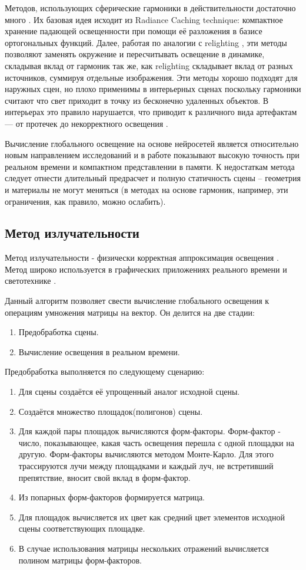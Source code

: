 \documentclass[oneside,final,12pt, a4paper]{extreport}
\newcommand\subsect[1]{%
  \subsection*{#1}%
  \addcontentsline{toc}{subsection}{#1}}
\begin{document}
Методов, использующих сферические гармоники в действительности достаточно много \cite{SPH, RadianceHints, PRT, ClusteredPRT, PRT2}. Их базовая идея исходит из Radiance Caching technique: компактное хранение падающей освещенности при помощи её разложения в базисе ортогональных функций. Далее, работая по аналогии с relighting \cite{RadianceHints, Relighting}, эти методы позволяют заменять окружение и пересчитывать освещение в динамике, складывая вклад от гармоник так же, как relighting складывает вклад от разных источников, суммируя отдельные изображения. Эти методы хорошо подходят для наружных сцен, но плохо применимы в интерьерных сценах поскольку гармоники считают что свет приходит в точку из бесконечно удаленных объектов. В интерьерах это правило нарушается, что приводит к различного вида артефактам --- от протечек до некорректного освещения \cite{RT_rendering}.

Вычисление глобального освещение на основе нейросетей является относительно новым направлением исследований и в работе \cite{NNGI} показывают высокую точность при реальном времени и компактном представлении в памяти. К недостаткам метода следует отнести длительный предрасчет и полную статичность сцены -- геометрия и материалы не могут меняться (в методах на основе гармоник, например, эти ограничения, как правило, можно ослабить).

\subsect{Метод излучательности}

Метод излучательности - физически корректная аппроксимация освещения \cite{RadiosityAndGI}. Метод широко используется в графических приложениях реального времени \cite{Enlighten} и светотехнике \cite{Dialux, Relux}.


Данный алгоритм позволяет свести вычисление глобального освещения к операциям умножения матрицы на вектор. Он делится на две стадии:
\begin{enumerate}
	\item Предобработка сцены.
	\item Вычисление освещения в реальном времени.
\end{enumerate}

Предобработка выполняется по следующему сценарию:
\begin{enumerate}
	\item Для сцены создаётся её упрощенный аналог исходной сцены.
	\item Создаётся множество площадок(полигонов) сцены.
	\item Для каждой пары площадок вычисляются форм-факторы. Форм-фактор - число, показывающее, какая часть освещения перешла с одной площадки на другую. Форм-факторы вычисляются методом Монте-Карло. Для этого трассируются лучи между площадками и каждый луч, не встретивший препятствие, вносит свой вклад в форм-фактор.
	\item Из попарных форм-факторов формируется матрица.
	\item Для площадок вычисляется их цвет как средний цвет элементов исходной сцены соответствующих площадке.
	\item В случае использования матрицы нескольких отражений вычисляется полином матрицы форм-факторов.
\end{enumerate}
\end{document}
